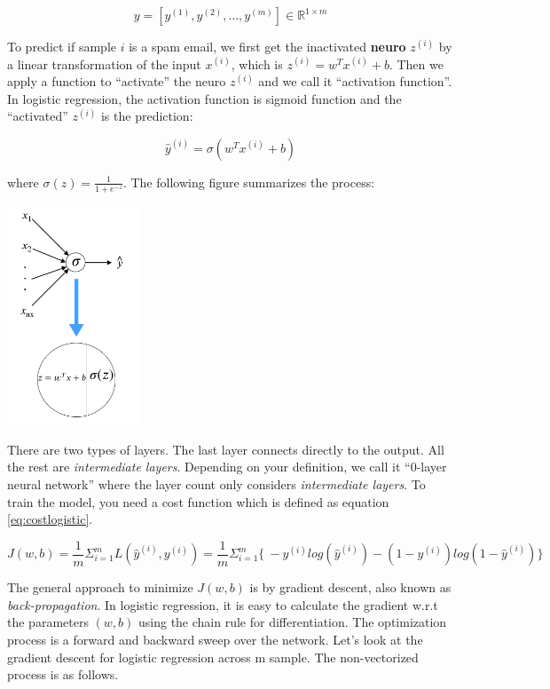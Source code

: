 \documentclass[12pt,]{krantz}
\begin{document}
\[y=[y^{(1)},y^{(2)},\dots,y^{(m)}] \in \mathbb{R}^{1 \times m}\]

To predict if sample \(i\) is a spam email, we first get the inactivated \textbf{neuro} \(z^{(i)}\) by a linear transformation of the input \(x^{(i)}\), which is \(z^{(i)}=w^Tx^{(i)} + b\). Then we apply a function to ``activate'' the neuro \(z^{(i)}\) and we call it ``activation function''. In logistic regression, the activation function is sigmoid function and the ``activated'' \(z^{(i)}\) is the prediction:

\[\hat{y}^{(i)} = \sigma(w^Tx^{(i)} + b)\]

where \(\sigma(z) = \frac{1}{1+e^{-z}}\). The following figure summarizes the process:

\includegraphics[width=0.3\textwidth,height=\textheight]{images/dnn0.png}

There are two types of layers. The last layer connects directly to the output. All the rest are \emph{intermediate layers}. Depending on your definition, we call it ``0-layer neural network'' where the layer count only considers \emph{intermediate layers}. To train the model, you need a cost function which is defined as equation \eqref{eq:costlogistic}.

\begin{equation}
J(w,b)=\frac{1}{m} \Sigma_{i=1}^m L(\hat{y}^{(i)}, y^{(i)}) = \frac{1}{m} \Sigma_{i=1}^{m} \{\ -y^{(i)}log(\hat{y}^{(i)})-(1-y^{(i)})log(1-\hat{y}^{(i)}) \}
\label{eq:costlogistic}
\end{equation}

The general approach to minimize \(J(w,b)\) is by gradient descent, also known as \emph{back-propagation}. In logistic regression, it is easy to calculate the gradient w.r.t the parameters \((w, b)\) using the chain rule for differentiation. The optimization process is a forward and backward sweep over the network. Let's look at the gradient descent for logistic regression across m sample. The non-vectorized process is as follows.
\end{document}
